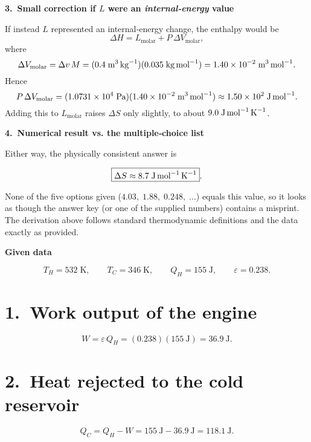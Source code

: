 \documentclass[12pt]{article}
\theoremstyle{definition} %
\theoremstyle{plain} %
\begin{document}
\bigskip
\textbf{3.\ Small correction if $L$ were an \emph{internal‑energy} value}

If instead \(L\) represented an internal‑energy change, the enthalpy would be
\[
\Delta H = L_{\text{molar}} + P\,\Delta V_{\text{molar}},
\]
where
\[
\Delta V_{\text{molar}}
   = \Delta v\,M
   = (0.4\;\text{m}^{3}\,\text{kg}^{-1})(0.035\;\text{kg\,mol}^{-1})
   = 1.40\times10^{-2}\;\text{m}^{3}\,\text{mol}^{-1}.
\]
Hence
\[
P\,\Delta V_{\text{molar}}
   = (1.0731\times10^{4}\;\text{Pa})(1.40\times10^{-2}\;\text{m}^{3}\,\text{mol}^{-1})
   \approx 1.50\times10^{2}\;\text{J\,mol}^{-1}.
\]
Adding this to \(L_{\text{molar}}\) raises \(\Delta S\) only slightly,
to about \(9.0\;\text{J\,mol}^{-1}\,\text{K}^{-1}\).

\bigskip
\textbf{4.\ Numerical result vs. the multiple‑choice list}

Either way, the physically consistent answer is

\[
\boxed{\Delta S \approx 8.7\;\text{J\,mol}^{-1}\,\text{K}^{-1}}.
\]

None of the five options given (\(4.03,\;1.88,\;0.248,\;\dots\)) equals this value, so it looks as though the answer key (or one of the supplied numbers) contains a misprint.  The derivation above follows standard thermodynamic definitions and the data exactly as provided.

\textbf{Given data}

\[
T_H = 532\;\text{K}, \qquad
T_C = 346\;\text{K}, \qquad
Q_H = 155\;\text{J}, \qquad
\varepsilon = 0.238.
\]

\section*{1.\ Work output of the engine}

\[
W = \varepsilon\,Q_H
   = (0.238)(155\ \text{J})
   = 36.9\ \text{J}.
\]

\section*{2.\ Heat rejected to the cold reservoir}

\[
Q_C = Q_H - W
     = 155\ \text{J} - 36.9\ \text{J}
     = 118.1\ \text{J}.
\]
\end{document}
